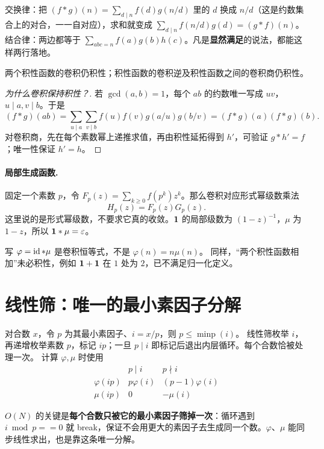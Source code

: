 \begin{tip}[自己验证一次只要两行]
交换律：把 $(f*g)(n)=\sum_{d\mid n}f(d)g(n/d)$ 里的 $d$ 换成 $n/d$（这是约数集合上的对合，一一自对应），求和就变成 $\sum_{d\mid n}f(n/d)g(d)=(g*f)(n)$。结合律：两边都等于 $\sum_{abc=n}f(a)g(b)h(c)$。凡是\textbf{显然满足}的说法，都能这样两行落地。
\end{tip}

两个积性函数的卷积仍积性；积性函数的卷积逆及积性函数之间的卷积商仍积性。


\begin{proof}[为什么卷积保持积性？]
若 $\gcd(a,b)=1$，每个 $ab$ 的约数唯一写成 $uv$，$u\mid a,v\mid b$。于是
\[
 (f*g)(ab)=\sum_{u\mid a}\sum_{v\mid b}f(u)f(v)g(a/u)g(b/v)
 =(f*g)(a)(f*g)(b).
\]
对卷积商，先在每个素数幂上递推求值，再由积性延拓得到 $h'$，可验证 $g*h'=f$；唯一性保证 $h'=h$。
\end{proof}
\paragraph{局部生成函数.}
固定一个素数 $p$，令 $F_p(z)=\sum_{k\ge0}f(p^k)z^k$。那么卷积对应形式幂级数乘法
\[
 H_p(z)=F_p(z)G_p(z).
\]
这里说的是形式幂级数，不要求它真的收敛。$\mathbf 1$ 的局部级数为 $(1-z)^{-1}$，$\mu$ 为 $1-z$，所以 $\mathbf 1*\mu=\varepsilon$。
\begin{pitfall}
写 $\varphi=\operatorname{id}*\mu$ 是卷积恒等式，不是 $\varphi(n)=n\mu(n)$。
同样，“两个积性函数相加”未必积性，例如 $\mathbf 1+\mathbf 1$ 在 $1$ 处为 $2$，已不满足归一化定义。
\end{pitfall}


\section{线性筛：唯一的最小素因子分解}
对合数 $x$，令 $p$ 为其最小素因子、$i=x/p$，则 $p\le\operatorname{minp}(i)$。
线性筛枚举 $i$，再递增枚举素数 $p$，标记 $ip$；一旦 $p\mid i$ 即标记后退出内层循环。每个合数恰被处理一次。
计算 $\varphi,\mu$ 时使用
\[
\begin{array}{c|cc}
 &p\mid i&p\nmid i\\\hline
\varphi(ip)&p\varphi(i)&(p-1)\varphi(i)\\
\mu(ip)&0&-\mu(i)
\end{array}
\]

\begin{tip}
$O(N)$ 的关键是\textbf{每个合数只被它的最小素因子筛掉一次}：循环遇到 $i\bmod p==0$ 就 break，保证不会用更大的素因子去生成同一个数。$\varphi$、$\mu$ 能同步线性求出，也是靠这条唯一分解。
\end{tip}

